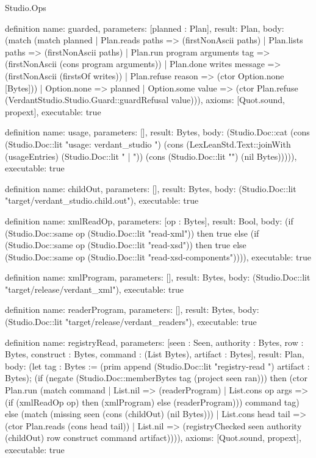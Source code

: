 \begin{lexlean}{Studio.Ops}
\begin{semanticmodule}
{definition{
  name: guarded,
  parameters: [planned : Plan],
  result: Plan,
  body: (match (match planned
      | Plan.reads paths => (firstNonAscii paths)
      | Plan.lists paths => (firstNonAscii paths)
      | Plan.run program arguments tag => (firstNonAscii (cons program arguments))
      | Plan.done writes message => (firstNonAscii (firstsOf writes))
      | Plan.refuse reason => (ctor Option.none [Bytes]))
    | Option.none => planned
    | Option.some value => (ctor Plan.refuse (VerdantStudio.Studio.Guard::guardRefusal value))),
  axioms: [Quot.sound, propext],
  executable: true
}

definition{
  name: usage,
  parameters: [],
  result: Bytes,
  body: (Studio.Doc::cat (cons (Studio.Doc::lit "usage: verdant_studio ") (cons (LexLeanStd.Text::joinWith (usageEntries) (Studio.Doc::lit " | ")) (cons (Studio.Doc::lit "\n") (nil Bytes))))),
  executable: true
}

definition{
  name: childOut,
  parameters: [],
  result: Bytes,
  body: (Studio.Doc::lit "target/verdant_studio.child.out"),
  executable: true
}

definition{
  name: xmlReadOp,
  parameters: [op : Bytes],
  result: Bool,
  body: (if (Studio.Doc::same op (Studio.Doc::lit "read-xml")) then true else (if (Studio.Doc::same op (Studio.Doc::lit "read-xsd")) then true else (Studio.Doc::same op (Studio.Doc::lit "read-xsd-components")))),
  executable: true
}

definition{
  name: xmlProgram,
  parameters: [],
  result: Bytes,
  body: (Studio.Doc::lit "target/release/verdant_xml"),
  executable: true
}

definition{
  name: readerProgram,
  parameters: [],
  result: Bytes,
  body: (Studio.Doc::lit "target/release/verdant_readers"),
  executable: true
}

definition{
  name: registryRead,
  parameters: [seen : Seen, authority : Bytes, row : Bytes, construct : Bytes, command : (List Bytes), artifact : Bytes],
  result: Plan,
  body: (let tag : Bytes := (prim append (Studio.Doc::lit "registry-read ") artifact : Bytes); (if (negate (Studio.Doc::memberBytes tag (project seen ran))) then (ctor Plan.run (match command
      | List.nil => (readerProgram)
      | List.cons op args => (if (xmlReadOp op) then (xmlProgram) else (readerProgram))) command tag) else (match (missing seen (cons (childOut) (nil Bytes)))
    | List.cons head tail => (ctor Plan.reads (cons head tail))
    | List.nil => (registryChecked seen authority (childOut) row construct command artifact)))),
  axioms: [Quot.sound, propext],
  executable: true
}

}
\end{semanticmodule}
\end{lexlean}
